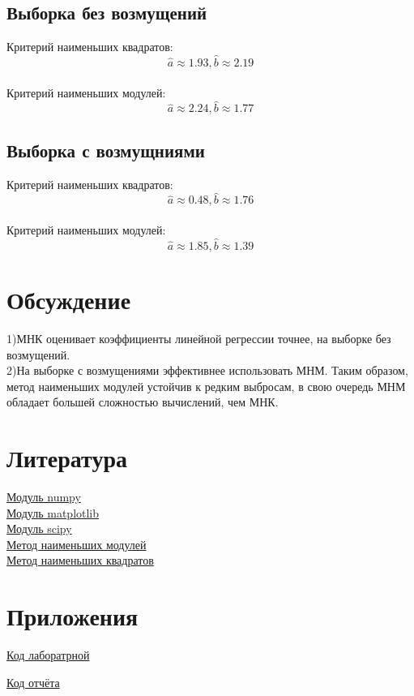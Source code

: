 \documentclass[a4]{article}
\begin{document}
		\subsection{Выборка без возмущений}
			Критерий наименьших квадратов:\\
			$$\hat{a} \approx 1.93,\hat{b} \approx 2.19$$\\
			
			Критерий наименьших модулей:\\
			$$\hat{a} \approx 2.24 ,\hat{b} \approx 1.77$$
		\subsection{Выборка с возмущниями}
			Критерий наименьших квадратов:\\
			$$\hat{a} \approx 0.48,\hat{b} \approx 1.76$$\\
			
			Критерий наименьших модулей:\\
			$$\hat{a} \approx 1.85 ,\hat{b} \approx 1.39$$
		
	\section{Обсуждение}
		1)МНК оценивает коэффициенты линейной регрессии точнее, на выборке без возмущений.\\
		
		2)На выборке с возмущениями эффективнее использовать МНМ. Таким образом, метод наименьших модулей устойчив к редким выбросам, в свою очередь МНМ обладает большей сложностью вычислений, чем МНК.
		
	\section{Литература}
	
	\href{https://physics.susu.ru/vorontsov/language/numpy.html}{Модуль numpy}\\
	
	\href{https://matplotlib.org/}{Модуль matplotlib}\\
	
	\href{https://www.scipy.org/}{Модуль scipy}\\
	
	\href{https://ru.wikipedia.org/wiki/%D0%9C%D0%B5%D1%82%D0%BE%D0%B4_%D0%BD%D0%B0%D0%B8%D0%BC%D0%B5%D0%BD%D1%8C%D1%88%D0%B8%D1%85_%D0%BC%D0%BE%D0%B4%D1%83%D0%BB%D0%B5%D0%B9}{Метод наименьших модулей}\\
	
	\href{https://ru.wikipedia.org/wiki/%D0%9C%D0%B5%D1%82%D0%BE%D0%B4_%D0%BD%D0%B0%D0%B8%D0%BC%D0%B5%D0%BD%D1%8C%D1%88%D0%B8%D1%85_%D0%BA%D0%B2%D0%B0%D0%B4%D1%80%D0%B0%D1%82%D0%BE%D0%B2}{Метод наименьших квадратов}\\
	
	\section{Приложения}
	
	\href{https://github.com/LuciusGen/Matstat/blob/master/Lab6/Lab6.py}{Код лаборатрной}
	
	\href{https://github.com/LuciusGen/Matstat/blob/master/Lab6/lab6.tex}{Код отчёта}
	
\end{document}

